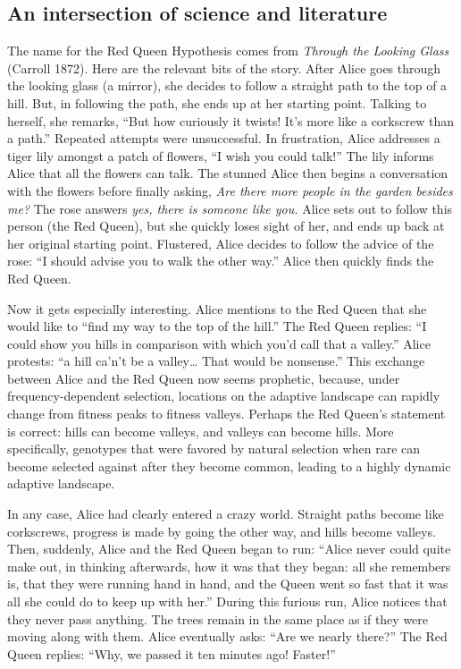 \documentclass[
  letterpaper,
]{book}
\begin{document}
\hypertarget{an-intersection-of-science-and-literature}{%
\subsection{An intersection of science and
literature}\label{an-intersection-of-science-and-literature}}

The name for the Red Queen Hypothesis comes from \emph{Through the
Looking Glass} (Carroll 1872). Here are the relevant bits of the story.
After Alice goes through the looking glass (a mirror), she decides to
follow a straight path to the top of a hill. But, in following the path,
she ends up at her starting point. Talking to herself, she remarks,
``But how curiously it twists! It's more like a corkscrew than a path.''
Repeated attempts were unsuccessful. In frustration, Alice addresses a
tiger lily amongst a patch of flowers, ``I wish you could talk!'' The
lily informs Alice that all the flowers can talk. The stunned Alice then
begins a conversation with the flowers before finally asking, \emph{Are
there more people in the garden besides me?} The rose answers \emph{yes,
there is someone like you.} Alice sets out to follow this person (the
Red Queen), but she quickly loses sight of her, and ends up back at her
original starting point. Flustered, Alice decides to follow the advice
of the rose: ``I should advise you to walk the other way.'' Alice then
quickly finds the Red Queen.

Now it gets especially interesting. Alice mentions to the Red Queen that
she would like to ``find my way to the top of the hill.'' The Red Queen
replies: ``I could show you hills in comparison with which you'd call
that a valley.'' Alice protests: ``a hill ca'n't be a valley\ldots{}
That would be nonsense.'' This exchange between Alice and the Red Queen
now seems prophetic, because, under frequency-dependent selection,
locations on the adaptive landscape can rapidly change from fitness
peaks to fitness valleys. Perhaps the Red Queen's statement is correct:
hills can become valleys, and valleys can become hills. More
specifically, genotypes that were favored by natural selection when rare
can become selected against after they become common, leading to a
highly dynamic adaptive landscape.

In any case, Alice had clearly entered a crazy world. Straight paths
become like corkscrews, progress is made by going the other way, and
hills become valleys. Then, suddenly, Alice and the Red Queen began to
run: ``Alice never could quite make out, in thinking afterwards, how it
was that they began: all she remembers is, that they were running hand
in hand, and the Queen went so fast that it was all she could do to keep
up with her.'' During this furious run, Alice notices that they never
pass anything. The trees remain in the same place as if they were moving
along with them. Alice eventually asks: ``Are we nearly there?'' The Red
Queen replies: ``Why, we passed it ten minutes ago! Faster!''
\end{document}
